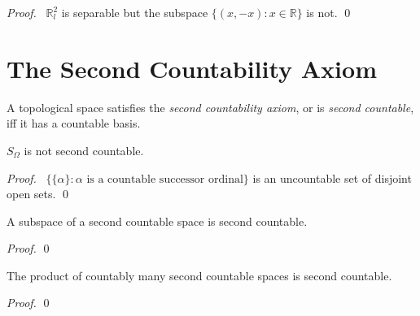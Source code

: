 \begin{proof}
 \pf\ $\mathbb{R}_l^2$ is separable but the subspace $\{ (x, -x) : x \in \mathbb{R} \}$ is not. \qed
\end{proof}

\section{The Second Countability Axiom}

  \begin{df}
  A topological space satisfies the \emph{second countability axiom}, or is
  \emph{second countable}, iff it has a countable basis.
\end{df}

 \begin{prop}
$S_\Omega$ is not second countable.
\end{prop}

\begin{proof}
 \pf\ $\{ \{ \alpha \} : \alpha \text{ is a countable successor ordinal} \}$
is an uncountable set of disjoint open sets. \qed
\end{proof}

\begin{prop}
  \label{prop:topology:second_countable:subspace}
 A subspace of a second countable space is second countable.
\end{prop}

\begin{proof}
 \pf
 \qed
\end{proof}

  \begin{prop}[CC]
 The product of countably many second countable spaces is second countable.
\end{prop}

\begin{proof}
 \pf
\qed
\end{proof}

